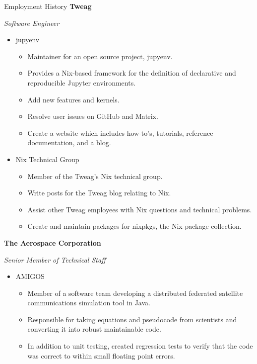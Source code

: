 \begin{rubric}{Employment History}
\entry*[02/22 -- 04/23]%
    \textbf{Tweag}\par
    \textit{Software Engineer}\par
    \begin{itemize}[nosep]
        \item jupyenv
        \begin{itemize}[nosep]
            \item Maintainer for an open source project, jupyenv.
            \item Provides a Nix-based framework for the definition of declarative and reproducible Jupyter environments.
            \item Add new features and kernels.
            \item Resolve user issues on GitHub and Matrix.
            \item Create a website which includes how-to’s, tutorials, reference documentation, and a blog.
        \end{itemize}
        \item Nix Technical Group
        \begin{itemize}[nosep]
            \item Member of the Tweag's Nix technical group.
            \item Write posts for the Tweag blog relating to Nix.
            \item Assist other Tweag employees with Nix questions and technical problems.
            \item Create and maintain packages for nixpkgs, the Nix package collection.
        \end{itemize}
    \end{itemize}
%
\entry*[07/20 -- 02/22]%
    \textbf{The Aerospace Corporation}\par
    \textit{Senior Member of Technical Staff}\par
    \begin{itemize}[nosep]
        \item AMIGOS
        \begin{itemize}[nosep]
            \item Member of a software team developing a distributed federated satellite communications simulation tool in Java.
            \item Responsible for taking equations and pseudocode from scientists and converting it into robust maintainable code.
            \item In addition to unit testing, created regression tests to verify that the code was correct to within small floating point errors.

\end{itemize}
\end{itemize}
\end{rubric}
